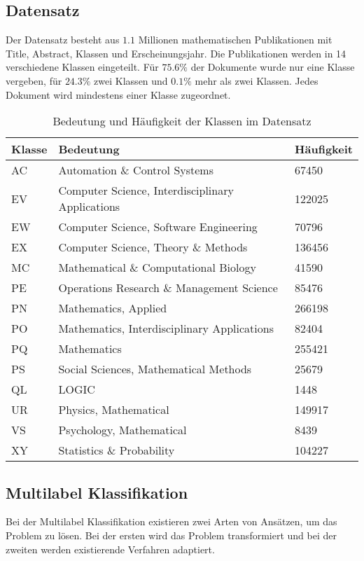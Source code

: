\subsection{Datensatz}
Der Datensatz besteht aus $1.1$ Millionen mathematischen Publikationen mit Title, Abstract, Klassen und Erscheinungsjahr. Die Publikationen werden in 14 verschiedene Klassen eingeteilt. Für $75.6 \%$ der Dokumente wurde nur eine Klasse vergeben, für $24.3 \%$ zwei Klassen und $0.1 \%$ mehr als zwei Klassen. Jedes Dokument wird mindestens einer Klasse zugeordnet.
\label{sub:datensatz}
\begin{table}[h]
    \centering
    \begin{tabular}{l|l|l}
        \textbf{Klasse} & \textbf{Bedeutung} & \textbf{Häufigkeit}\\
        \hline
        AC & Automation \& Control Systems & 67450\\
        EV & Computer Science, Interdisciplinary Applications & 122025\\
        EW & Computer Science, Software Engineering & 70796\\
        EX & Computer Science, Theory \& Methods & 136456\\
        MC & Mathematical \& Computational Biology & 41590\\
        PE & Operations Research \& Management Science & 85476\\
        PN & Mathematics, Applied & 266198\\
        PO & Mathematics, Interdisciplinary Applications & 82404\\
        PQ & Mathematics & 255421\\
        PS & Social Sciences, Mathematical Methods & 25679\\
        QL & LOGIC & 1448\\
        UR & Physics, Mathematical & 149917\\
        VS & Psychology, Mathematical & 8439\\
        XY & Statistics \& Probability & 104227\\
    \end{tabular}
    \caption{Bedeutung und Häufigkeit der Klassen im Datensatz}
\end{table}


\subsection{Multilabel Klassifikation}
\label{sub:multilabel_klassifikation}
Bei der Multilabel Klassifikation existieren zwei Arten von Ansätzen, um das Problem zu lösen. Bei der ersten wird das Problem transformiert und bei der zweiten werden existierende Verfahren adaptiert.

